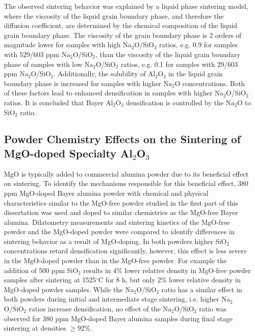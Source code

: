 The observed sintering behavior was explained by a liquid phase sintering model, where the viscosity of the liquid grain boundary phase, and therefore the diffusion coefficient, are determined by the chemical composition of the liquid grain boundary phase. The viscosity of the grain boundary phase is 2 orders of magnitude lower for samples with high Na$_{2}$O/SiO$_{2}$ ratios, e.g. 0.9 for samples with 529/603 ppm Na$_{2}$O/SiO$_{2}$, than the viscosity of the liquid grain boundary phase of samples with low Na$_{2}$O/SiO$_{2}$ ratios, e.g. 0.1 for samples with 29/603 ppm Na$_{2}$O/SiO$_{2}$. Additionally, the solubility of Al$_{2}$O$_{3}$ in the liquid grain boundary phase is increased for samples with higher Na$_{2}$O concentrations. Both of these factors lead to enhanced densification in samples with higher Na$_{2}$O/SiO$_{2}$ ratios. It is concluded that Bayer Al$_{2}$O$_{3}$ densification is controlled by the Na$_{2}$O to SiO$_{2}$ ratio.

\subsection{Powder Chemistry Effects on the Sintering of MgO-doped Specialty Al$_{2}$O$_{3}$}
MgO is typically added to commercial alumina powder due to its beneficial effect on sintering. To identify the mechanisms responsible for this beneficial effect, 380 ppm MgO-doped Bayer alumina powder with chemical and physical characteristics similar to the MgO-free powder studied in the first part of this dissertation was used and doped to similar chemistries as the MgO-free Bayer alumina. Dilatometry measurements and sintering kinetics of the MgO-free powder and the MgO-doped powder were compared to identify differences in sintering behavior as a result of MgO-doping. In both powders higher SiO$_{2}$ concentrations retard densification significantly, however, this effect is less severe in the MgO-doped powder than in the MgO-free powder. For example the addition of 500 ppm SiO$_{2}$ results in 4\% lower relative density in MgO-free powder samples after sintering at 1525$^{\circ}$C for 8 h, but only 2\% lower relative density in MgO-doped powder samples. While the Na$_{2}$O/SiO$_{2}$ ratio has a similar effect in both powders during initial and intermediate stage sintering, i.e. higher Na$_{2}$O/SiO$_{2}$ ratios increase densification, no effect of the Na$_{2}$O/SiO$_{2}$ ratio was observed for 380 ppm MgO-doped Bayer alumina samples during final stage sintering at densities $\geq$92\%. 

